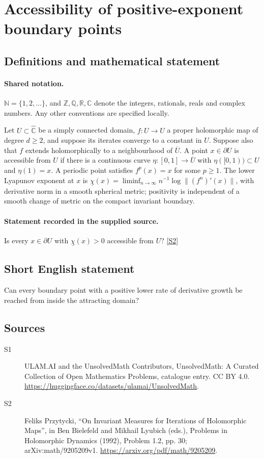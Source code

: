 \documentclass[11pt]{article}
\newcommand{\sref}[2]{\hyperlink{source:#1:#2}{[S#2]}}
\begin{document}
\section{Accessibility of positive-exponent boundary points}\label{statement}

\subsection{Definitions and mathematical statement}

\paragraph{Shared notation.}$\mathbb N=\{1,2,\ldots\}$, and $\mathbb Z,\mathbb Q,\mathbb R,\mathbb C$ denote the integers, rationals, reals and complex numbers. Any other conventions are specified locally.


Let $U\subset\widehat{\mathbb C}$ be a simply connected domain, $f:U\to U$ a proper holomorphic map of degree $d\geq2$, and suppose its iterates converge to a constant in $U$. Suppose also that $f$ extends holomorphically to a neighbourhood of $\overline U$. A point $x\in\partial U$ is accessible from $U$ if there is a continuous curve $\eta:[0,1]\to\overline U$ with $\eta([0,1))\subset U$ and $\eta(1)=x$. A periodic point satisfies $f^p(x)=x$ for some $p\geq1$. The lower Lyapunov exponent at $x$ is $\underline\chi(x)=\liminf_{n\to\infty}n^{-1}\log\|(f^n)'(x)\|$, with derivative norm in a smooth spherical metric; positivity is independent of a smooth change of metric on the compact invariant boundary.
\paragraph{Statement recorded in the supplied source.}
Is every $x\in\partial U$ with $\underline\chi(x)>0$ accessible from $U$? \sref{statement}{2}
\subsection{Short English statement}
Can every boundary point with a positive lower rate of derivative growth be reached from inside the attracting domain?
\subsection{Sources}
\begin{description}
\item[\hypertarget{source:statement:1}{S1}] ULAM.AI and the UnsolvedMath Contributors, UnsolvedMath: A Curated Collection of Open Mathematics Problems, catalogue entry. CC BY 4.0. \url{https://huggingface.co/datasets/ulamai/UnsolvedMath}.
\item[\hypertarget{source:statement:2}{S2}] Feliks Przytycki, ``On Invariant Measures for Iterations of Holomorphic Maps'', in Ben Bielefeld and Mikhail Lyubich (eds.), Problems in Holomorphic Dynamics (1992), Problem 1.2, pp. 30; arXiv:math/9205209v1. \url{https://arxiv.org/pdf/math/9205209}.
\end{description}
\label{end:statement}
\end{document}
